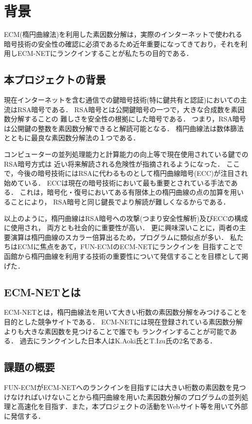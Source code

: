 \documentclass[openany,11pt,papersize]{jsbook}
\begin{document}
\chapter{背景}

ECM(楕円曲線法)を利用した素因数分解は，実際のインターネットで使われる暗号技術の安全性の確認に必須であるため近年重要になってきており，それを利用しECM-NETにランクインすることが私たちの目的である．


\section{本プロジェクトの背景}

現在インターネットを含む通信での鍵暗号技術(特に鍵共有と認証)においての主流はRSA暗号である．
RSA暗号とは公開鍵暗号の一つで，大きな合成数を素因数分解することの
難しさを安全性の根拠にした暗号である．
つまり，RSA暗号は公開鍵の整数を素因数分解できると解読可能となる．
楕円曲線法は数体篩法とともに最良な素因数分解法の１つである．

コンピューターの並列処理能力と計算能力の向上等で現在使用されている鍵でのRSA暗号方式は
近い将来解読される危険性が指摘されるようになった．
ここで，今後の暗号技術にはRSAに代わるものとして楕円曲線暗号(ECC)が注目され始めている．
ECCは現在の暗号技術において最も重要とされている手法である．
これは，暗号化・復号においてある有限体上の楕円曲線の点の加算を用いることにより，
RSA暗号と同じ鍵長でより解読が難しくなるからである．

以上のように，楕円曲線はRSA暗号への攻撃(つまり安全性解析)及びECCの構成に使用され，
両方とも社会的に重要性が高い．
更に興味深いことに，両者の主要演算は楕円曲線のスカラー倍算出るため，プログラムに類似点が多い．
私たちはECMに焦点をあて，FUN-ECMのECM-NETにランクインを
目指すことで函館から楕円曲線を利用する技術の重要性について発信することを目標として掲げた．


\section{ECM-NETとは}

ECM-NETとは，楕円曲線法を用いて大きい桁数の素因数分解をみつけることを目的とした競争サイトである．
ECM-NETには現在登録されている素因数分解よりも大きな素因数を見つけることで誰でも
ランクインすることが可能である．
過去にランクインした日本人はK.Aoki氏とT.Izu氏の2名である．


\section{課題の概要}\label{sec:gaiyou}

FUN-ECMがECM-NETへのランクインを目指すには大きい桁数の素因数を見つけなければいけないことから楕円曲線を用いた素因数分解のプログラムの並列処理と高速化を目指す．また，本プロジェクトの活動をWebサイト等を用いて外部に発信する．

\end{document}
